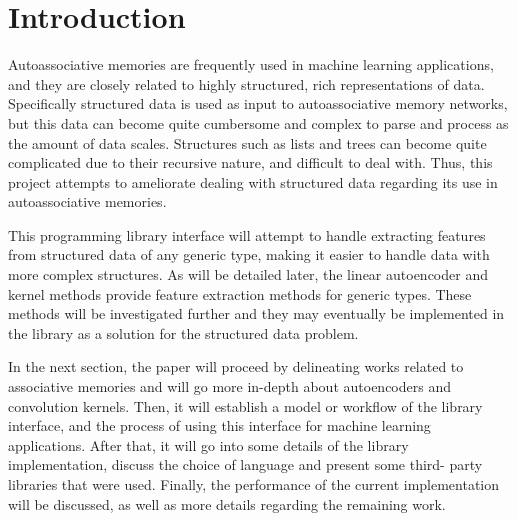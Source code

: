\documentclass{sig-alternate}
\begin{document}
\section{Introduction}
\label{sec:intro}
Autoassociative memories are frequently used in machine learning applications, and they are closely
related to highly structured, rich representations of data. Specifically structured data is used as input
to autoassociative memory networks, but this data can become quite cumbersome and complex to parse and 
process as the amount of data scales. Structures such as lists and trees can become quite complicated due 
to their recursive nature, and difficult to deal with. Thus, this project attempts to ameliorate dealing 
with structured data regarding its use in autoassociative memories.

This programming library interface will attempt to handle extracting features from structured 
data of any generic type, making it easier to handle data with more complex structures. 
As will be detailed later, the linear autoencoder and kernel methods provide feature extraction 
methods for generic types. These methods will be investigated further and they may eventually be 
implemented in the library as a solution for the structured data problem.




In the next section, the paper will proceed by delineating works related to 
associative memories and will go more in-depth about autoencoders 
and convolution kernels. Then, it will establish a model or workflow of the 
library interface, and the process of using this interface for machine
learning applications. After that, it will go into some details of the library
implementation, discuss the choice of language and present some third-
party libraries that were used. Finally, the performance of the current
implementation will be discussed, as well as more details regarding the remaining work.
\end{document}
